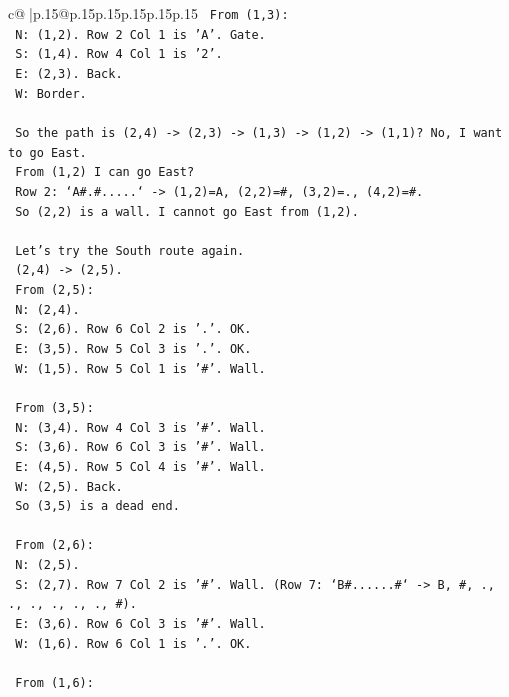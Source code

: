 \documentclass{article}
\begin{document}
{\begin{supertabular}{c@{$\;$}|p{.15\linewidth}@{}p{.15\linewidth}p{.15\linewidth}p{.15\linewidth}p{.15\linewidth}p{.15\linewidth}}
{{{\texttt{   From (1,3):} \\
\texttt{   N: (1,2). Row 2 Col 1 is 'A'. Gate.} \\
\texttt{   S: (1,4). Row 4 Col 1 is '2'.} \\
\texttt{   E: (2,3). Back.} \\
\texttt{   W: Border.} \\
\\ 
\texttt{   So the path is (2,4) {-}> (2,3) {-}> (1,3) {-}> (1,2) {-}> (1,1)? No, I want to go East.} \\
\texttt{   From (1,2) I can go East?} \\
\texttt{   Row 2: `A\#.\#.....` {-}> (1,2)=A, (2,2)=\#, (3,2)=., (4,2)=\#.} \\
\texttt{   So (2,2) is a wall. I cannot go East from (1,2).} \\
\\ 
\texttt{   Let's try the South route again.} \\
\texttt{   (2,4) {-}> (2,5).} \\
\texttt{   From (2,5):} \\
\texttt{   N: (2,4).} \\
\texttt{   S: (2,6). Row 6 Col 2 is '.'. OK.} \\
\texttt{   E: (3,5). Row 5 Col 3 is '.'. OK.} \\
\texttt{   W: (1,5). Row 5 Col 1 is '\#'. Wall.} \\
\\ 
\texttt{   From (3,5):} \\
\texttt{   N: (3,4). Row 4 Col 3 is '\#'. Wall.} \\
\texttt{   S: (3,6). Row 6 Col 3 is '\#'. Wall.} \\
\texttt{   E: (4,5). Row 5 Col 4 is '\#'. Wall.} \\
\texttt{   W: (2,5). Back.} \\
\texttt{   So (3,5) is a dead end.} \\
\\ 
\texttt{   From (2,6):} \\
\texttt{   N: (2,5).} \\
\texttt{   S: (2,7). Row 7 Col 2 is '\#'. Wall. (Row 7: `B\#......\#` {-}> B, \#, ., ., ., ., ., ., \#).} \\
\texttt{   E: (3,6). Row 6 Col 3 is '\#'. Wall.} \\
\texttt{   W: (1,6). Row 6 Col 1 is '.'. OK.} \\
\\ 
\texttt{   From (1,6):} \\
}}}
\end{supertabular}}
\end{document}
